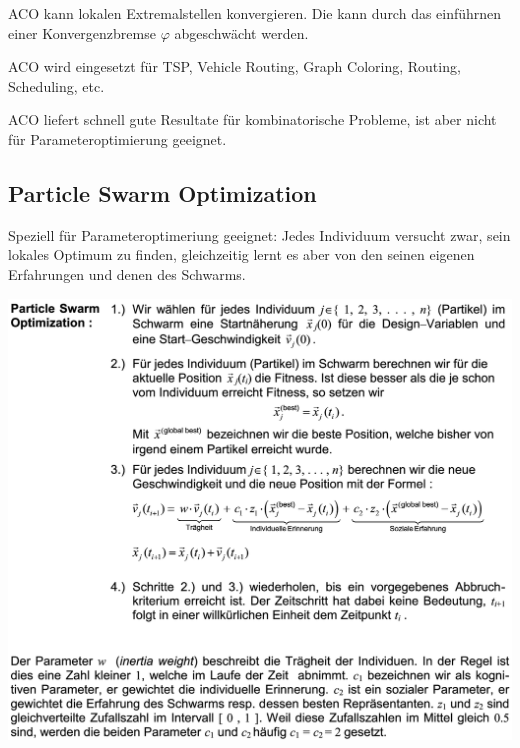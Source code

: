   ACO kann lokalen Extremalstellen konvergieren. Die kann durch das einführnen einer Konvergenzbremse $\varphi$ abgeschwächt werden.
  
  ACO wird eingesetzt für TSP, Vehicle Routing, Graph Coloring, Routing, Scheduling, etc.
  
  ACO liefert schnell gute Resultate für kombinatorische Probleme, ist aber nicht für Parameteroptimierung geeignet.\\
  
  
  
  \newpage
\subsection{Particle Swarm Optimization }
  Speziell für Parameteroptimeriung geeignet: Jedes Individuum versucht zwar, sein lokales Optimum zu finden, gleichzeitig lernt es aber von den seinen eigenen Erfahrungen und denen des Schwarms.
  
  \begin{center}
  \includegraphics[width=0.7\linewidth]{./Content/MetaHeuristics/partSwarm}
  \end{center}
  
  
  

